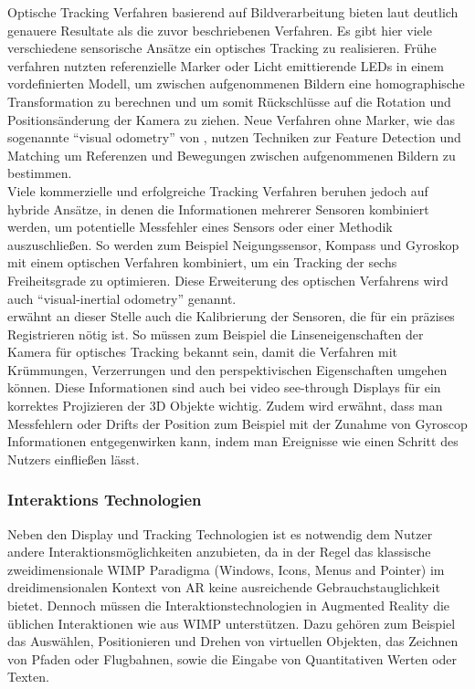 Optische Tracking Verfahren basierend auf Bildverarbeitung bieten laut \citet{van2010survey} deutlich genauere Resultate als die zuvor beschriebenen Verfahren. Es gibt hier viele verschiedene sensorische Ansätze ein optisches Tracking zu realisieren. Frühe verfahren nutzten referenzielle Marker oder Licht emittierende LEDs in einem vordefinierten Modell, um zwischen aufgenommenen Bildern eine homographische Transformation zu berechnen und um somit Rückschlüsse auf die Rotation und Positionsänderung der Kamera zu ziehen. Neue Verfahren ohne Marker, wie das sogenannte \enquote{visual odometry} von \citet{nister2004visual}, nutzen Techniken zur Feature Detection und Matching um Referenzen und Bewegungen zwischen aufgenommenen Bildern zu bestimmen.\\

Viele kommerzielle und erfolgreiche Tracking Verfahren beruhen jedoch auf hybride Ansätze, in denen die Informationen mehrerer Sensoren kombiniert werden, um potentielle Messfehler eines Sensors oder einer Methodik auszuschließen. So werden zum Beispiel Neigungssensor, Kompass und Gyroskop mit einem optischen Verfahren kombiniert, um ein Tracking der sechs Freiheitsgrade zu optimieren. Diese Erweiterung des optischen Verfahrens wird auch \enquote{visual-inertial odometry} genannt. \citep{van2010survey}\\

\citet{azuma2001recent} erwähnt an dieser Stelle auch die Kalibrierung der Sensoren, die für ein präzises Registrieren nötig ist. So müssen zum Beispiel die Linseneigenschaften der Kamera für optisches Tracking bekannt sein, damit die Verfahren mit Krümmungen, Verzerrungen und den perspektivischen Eigenschaften umgehen können. Diese Informationen sind auch bei video see-through Displays für ein korrektes Projizieren der 3D Objekte wichtig. Zudem wird erwähnt, dass man Messfehlern oder Drifts der Position zum Beispiel mit der Zunahme von Gyroscop Informationen entgegenwirken kann, indem man Ereignisse wie einen Schritt des Nutzers einfließen lässt. \citep{azuma2001recent} \\

\subsubsection{Interaktions Technologien} \label{sec:ar-interaction}

Neben den Display und Tracking Technologien ist es notwendig dem Nutzer andere Interaktionsmöglichkeiten anzubieten, da in der Regel das klassische zweidimensionale WIMP Paradigma (Windows, Icons, Menus and Pointer) im dreidimensionalen Kontext von AR keine ausreichende Gebrauchstauglichkeit bietet. Dennoch müssen die Interaktionstechnologien in Augmented Reality die üblichen Interaktionen wie aus WIMP unterstützen. Dazu gehören zum Beispiel das Auswählen, Positionieren und Drehen von virtuellen Objekten, das Zeichnen von Pfaden oder Flugbahnen, sowie die Eingabe von Quantitativen Werten oder Texten. \citep{van2010survey} \\

